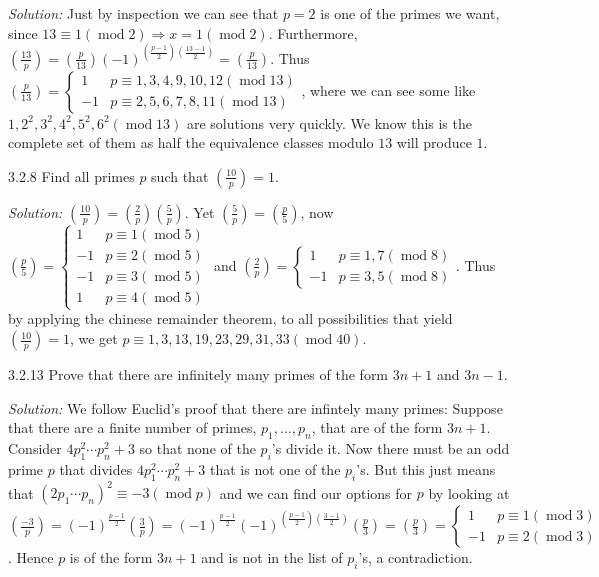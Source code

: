 \documentclass{letter}
\newcommand{\tmem}[1]{{\em #1\/}}
\newcommand{\tmop}[1]{\ensuremath{\operatorname{#1}}}
\begin{document}
{\tmem{Solution:}} Just by inspection we can see that $p = 2$ is one of the
primes we want, since $13 \equiv 1 (\tmop{mod} 2) \Rightarrow x = 1
(\tmop{mod} 2)$. Furthermore, $\left( \frac{13}{p} \right) = \left(
\frac{p}{13} \right) (- 1)^{( \frac{p - 1}{2}) ( \frac{13 - 1}{2})} = \left(
\frac{p}{13} \right)$. Thus $\left( \frac{p}{13} \right) = \left\{
\begin{array}{ll}
  1 & p \equiv 1, 3, 4, 9, 10, 12 (\tmop{mod} 13)\\
  - 1 & p \equiv 2, 5, 6, 7, 8, 11 (\tmop{mod} 13)
\end{array} \right.$, where we can see some like $1, 2^2, 3^2, 4^2, 5^2, 6^2
(\tmop{mod} 13)$ are solutions very quickly. We know this is the complete set
of them as half the equivalence classes modulo $13$ will produce $1$.

3.2.8 Find all primes $p$ such that $\left( \frac{10}{p} \right) = 1$.

{\tmem{Solution:}} $\left( \frac{10}{p} \right) = \left( \frac{2}{p} \right)
\left( \frac{5}{p} \right)$. Yet $\left( \frac{5}{p} \right) = \left(
\frac{p}{5} \right)$, now $\left( \frac{p}{5} \right) = \left\{
\begin{array}{ll}
  1 & p \equiv 1 (\tmop{mod} 5)\\
  - 1 & p \equiv 2 (\tmop{mod} 5)\\
  - 1 & p \equiv 3 (\tmop{mod} 5)\\
  1 & p \equiv 4 (\tmop{mod} 5)
\end{array} \right.$ and $\left( \frac{2}{p} \right) = \left\{
\begin{array}{ll}
  1 & p \equiv 1, 7 (\tmop{mod} 8)\\
  - 1 & p \equiv 3, 5 (\tmop{mod} 8)
\end{array} \right.$. Thus by applying the chinese remainder theorem, to all
possibilities that yield $\left( \frac{10}{p} \right) = 1$, we get $p \equiv
1, 3, 13, 19, 23, 29, 31, 33 (\tmop{mod} 40)$.

3.2.13 Prove that there are infinitely many primes of the form $3 n + 1$ and
$3 n - 1$.

{\tmem{Solution:}} We follow Euclid's proof that there are infintely many
primes: Suppose that there are a finite number of primes, $p_1, \ldots, p_n$,
that are of the form $3 n + 1$. Consider $4 p_1^2 \cdots p_n^2 + 3$ so that
none of the $p_i$'s divide it. Now there must be an odd prime $p$ that divides
$4 p_1^2 \cdots p_n^2 + 3$ that is not one of the $p_i$'s. But this just means
that $\text{$(2 p_1 \cdots p_n)^2$} \equiv - 3 (\tmop{mod} p)$ and we can find
our options for $p$ by looking at $\left( \frac{- 3}{p} \right) = (-
1)^{\frac{p - 1}{2}} \left( \frac{3}{p} \right) = (- 1)^{\frac{p - 1}{2}} (-
1)^{( \frac{p - 1}{2}) ( \frac{3 - 1}{2})} \left( \frac{p}{3} \right) = \left(
\frac{p}{3} \right) = \left\{ \begin{array}{ll}
  1 & p \equiv 1 (\tmop{mod} 3)\\
  - 1 & p \equiv 2 (\tmop{mod} 3)
\end{array} \right.$. Hence $p$ is of the form $3 n + 1$ and is not in the
list of $p_i$'s, a contradiction.
\end{document}
